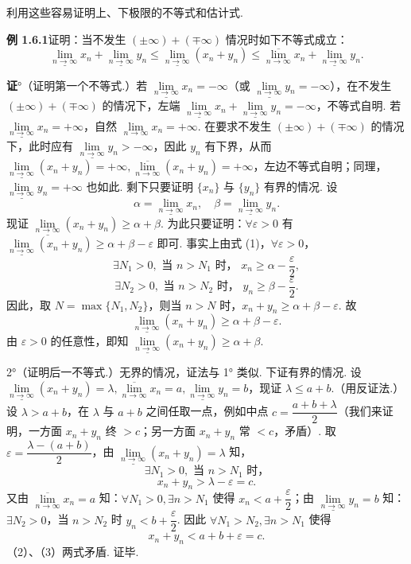 \documentclass[UTF8, 12pt, fontset=fandol, oneside]{ctexart}
\begin{document}
利用这些容易证明上、下极限的不等式和估计式.

\noindent\textbf{例 1.6.1}\quad 证明：当不发生 $(\pm\infty)+(\mp\infty)$ 情况时如下不等式成立：
\[
  \underline{\lim_{n\to\infty}}x_n+\underline{\lim_{n\to\infty}}y_n
  \le \underline{\lim_{n\to\infty}}(x_n+y_n)
  \le \overline{\lim_{n\to\infty}}x_n+\underline{\lim_{n\to\infty}}y_n.
\]

\noindent\textbf{证}°（证明第一个不等式.）若 $\underline{\lim\limits_{n\to\infty}}x_n=-\infty$（或 $\underline{\lim\limits_{n\to\infty}}y_n=-\infty$），在不发生 $(\pm\infty)+(\mp\infty)$ 的情况下，左端 $\underline{\lim\limits_{n\to\infty}}x_n+\underline{\lim\limits_{n\to\infty}}y_n=-\infty$，不等式自明. 若 $\underline{\lim\limits_{n\to\infty}}x_n=+\infty$，自然 $\lim\limits_{n\to\infty}x_n=+\infty$. 在要求不发生 $(\pm\infty)+(\mp\infty)$ 的情况下，此时应有 $\underline{\lim\limits_{n\to\infty}}y_n>-\infty$，因此 $y_n$ 有下界，从而 $\underline{\lim\limits_{n\to\infty}}(x_n+y_n)=+\infty,\overline{\lim\limits_{n\to\infty}}(x_n+y_n)=+\infty$，左边不等式自明；同理，$\underline{\lim\limits_{n\to\infty}}y_n=+\infty$ 也如此. 剩下只要证明 $\{x_n\}$ 与 $\{y_n\}$ 有界的情况. 设
\[
  \alpha=\underline{\lim_{n\to\infty}}x_n,\quad \beta=\underline{\lim_{n\to\infty}}y_n.
\tag{1}
\]
现证 $\underline{\lim\limits_{n\to\infty}}(x_n+y_n)\ge \alpha+\beta$. 为此只要证明：$\forall \varepsilon>0$ 有 $\underline{\lim\limits_{n\to\infty}}(x_n+y_n)\ge \alpha+\beta-\varepsilon$ 即可. 事实上由式 (1)，$\forall \varepsilon>0$，
\[
  \exists N_1>0,\text{ 当 }n>N_1\text{ 时， }x_n\ge \alpha-\frac{\varepsilon}{2},
\]
\[
  \exists N_2>0,\text{ 当 }n>N_2\text{ 时， }y_n\ge \beta-\frac{\varepsilon}{2}.
\]
因此，取 $N=\max\{N_1,N_2\}$，则当 $n>N$ 时，$x_n+y_n\ge \alpha+\beta-\varepsilon$. 故
\[
  \underline{\lim_{n\to\infty}}(x_n+y_n)\ge \alpha+\beta-\varepsilon.
\]
由 $\varepsilon>0$ 的任意性，即知 $\underline{\lim\limits_{n\to\infty}}(x_n+y_n)\ge \alpha+\beta$.

2°（证明后一不等式.）无界的情况，证法与 1° 类似. 下证有界的情况. 设 $\underline{\lim\limits_{n\to\infty}}(x_n+y_n)=\lambda,\overline{\lim\limits_{n\to\infty}}x_n=a,\underline{\lim\limits_{n\to\infty}}y_n=b$，现证 $\lambda\le a+b$.（用反证法.）设 $\lambda>a+b$，在 $\lambda$ 与 $a+b$ 之间任取一点，例如中点 $c=\dfrac{a+b+\lambda}{2}$（我们来证明，一方面 $x_n+y_n$ 终 $>c$；另一方面 $x_n+y_n$ 常 $<c$，矛盾）. 取 $\varepsilon=\dfrac{\lambda-(a+b)}{2}$，由 $\underline{\lim\limits_{n\to\infty}}(x_n+y_n)=\lambda$ 知，
\[
  \exists N_1>0,\text{ 当 }n>N_1\text{ 时，}
\]
\[
  x_n+y_n>\lambda-\varepsilon=c.
\tag{2}
\]
又由 $\overline{\lim\limits_{n\to\infty}}x_n=a$ 知：$\forall N_1>0,\exists n>N_1$ 使得 $x_n<a+\dfrac{\varepsilon}{2}$；由 $\underline{\lim\limits_{n\to\infty}}y_n=b$ 知：$\exists N_2>0$，当 $n>N_2$ 时 $y_n<b+\dfrac{\varepsilon}{2}$. 因此 $\forall N_1>N_2,\exists n>N_1$ 使得
\[
  x_n+y_n<a+b+\varepsilon=c.
\tag{3}
\]
（2）、（3）两式矛盾. 证毕.
\end{document}
